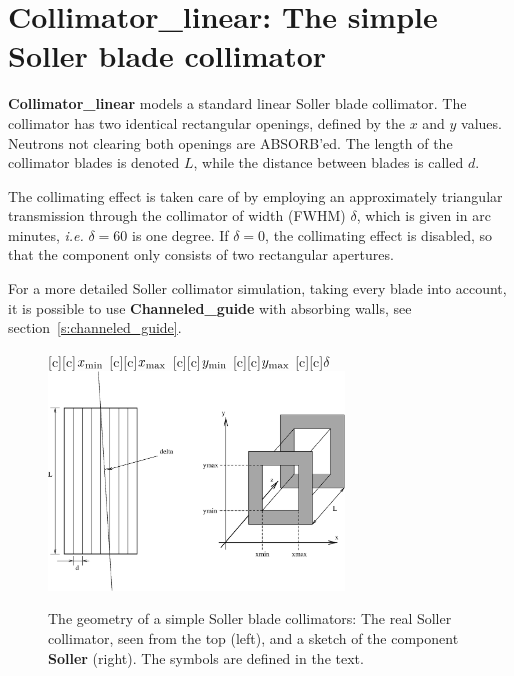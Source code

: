 \section{Collimator\_linear: The simple Soller blade collimator}
\label{collimator-linear}


{\bf Collimator\_linear} models a standard linear Soller blade collimator.
The collimator has two identical rectangular openings,
defined by the $x$ and $y$ values. Neutrons not clearing both
openings are ABSORB'ed.
The length of the collimator blades is denoted $L$, while
the distance between blades is called $d$.

The collimating effect is taken care of by employing an approximately
triangular transmission through the collimator of width (FWHM) $\delta$, 
which is given in arc minutes, {\em i.e.} $\delta=60$ is one degree.
If $\delta=0$, the collimating effect is disabled,
so that the component only consists of two rectangular apertures.

For a more detailed Soller collimator simulation,
taking every blade into account, it is possible to use
{\bf Channeled\_guide} with absorbing walls, 
see section~\ref{s:channeled_guide}.

\begin{figure}[h!]
  \begin{center}
    [c][c]{$x_{\rm min}$}
    [c][c]{$x_{\rm max}$}
    [c][c]{$y_{\rm min}$}
    [c][c]{$y_{\rm max}$}
    [c][c]{$\delta$}
    \includegraphics[width=0.7\textwidth]{figures/collimator.eps}
  \end{center}
\caption{The geometry of a simple Soller blade collimators:
The real Soller collimator, seen from the top (left),
and a sketch of the component {\bf Soller} (right).
The symbols are defined in the text.}
\label{f:collimator}
\end{figure}

